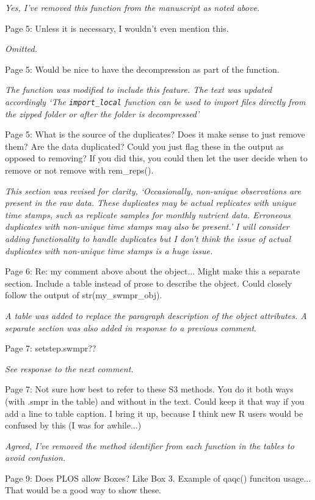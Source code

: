 \documentclass[letterpaper,12pt]{article}\usepackage[]{graphicx}\usepackage[]{color}
\begin{document}
{\it Yes, I've removed this function from the manuscript as noted above.}

Page 5: Unless it is necessary, I wouldn't even mention this.

{\it Omitted.}

Page 5: Would be nice to have the decompression as part of the function.

{\it The function was modified to include this feature.  The text was updated accordingly `The \texttt{import\_local} function can be used to import files directly from the zipped folder or after the folder is decompressed'}

Page 5: What is the source of the duplicates? Does it make sense to just remove them? Are the data duplicated? Could you just flag these in the output as opposed to removing? If you did this, you could then let the user decide when to remove or not remove with rem\_reps().

{\it This section was revised for clarity, `Occasionally, non-unique observations are present in the raw data.  These duplicates may be actual replicates with unique time stamps, such as replicate samples for monthly nutrient data.  Erroneous duplicates with non-unique time stamps may also be present.'  I will consider adding functionality to handle duplicates but I don't think the issue of actual duplicates with non-unique time stamps is a huge issue.}

Page 6: Re: my comment above about the object... Might make this a separate section. Include a table instead of prose to describe the object. Could closely follow the output of str(my\_swmpr\_obj).

{\it A table was added to replace the paragraph description of the object attributes.  A separate section was also added in response to a previous comment}.

Page 7: setstep.swmpr??

{\it See response to the next comment.}

Page 7: Not sure how best to refer to these S3 methods. You do it both ways (with .smpr in the table) and without in the text. Could keep it that way if you add a line to table caption. I bring it up, because I think new R users would be confused by this (I was for awhile...)

{\it Agreed, I've removed the method identifier from each function in the tables to avoid confusion.}

Page 9: Does PLOS allow Boxes? Like Box 3. Example of qaqc() funciton usage... That would be a good way to show these.
\end{document}

